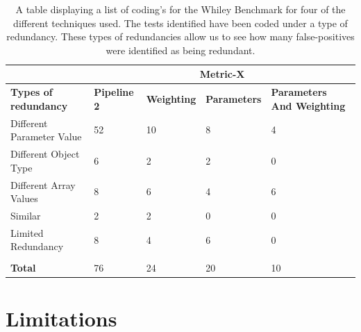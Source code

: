 \begin{table}[]
\centering
\begin{tabular}{|l|l|l|l|l|}
\hline
                             & \multicolumn{4}{c|}{\textbf{Metric-X}}                                                              \\ \hline
\textbf{Types of redundancy} & \textbf{Pipeline 2} & \textbf{Weighting} & \textbf{Parameters} & \textbf{Parameters  And Weighting} \\ \hline
Different Parameter Value    & 52                  & 10                 & 8                   & 4                                  \\ \hline
Different Object Type        & 6                   & 2                  & 2                   & 0                                  \\ \hline
Different Array Values       & 8                   & 6                  & 4                   & 6                                  \\ \hline
Similar                      & 2                   & 2                  & 0                   & 0                                  \\ \hline
Limited Redundancy           & 8                   & 4                  & 6                   & 0                                  \\ \hline
\textbf{}                    &                     &                    &                     &                                    \\ \hline
\textbf{Total}               & 76                  & 24                 & 20                  & 10                                 \\ \hline
\end{tabular}
\caption[A table displaying a list of coding's for the Whiley Benchmark for four of the different techniques used]{A table displaying a list of coding's for the Whiley Benchmark for four of the different techniques used. The tests identified have been coded under a type of redundancy. These types of redundancies allow us to see how many false-positives were identified as being redundant.}
\label{metriccoding}
\end{table}

\section{Limitations}

